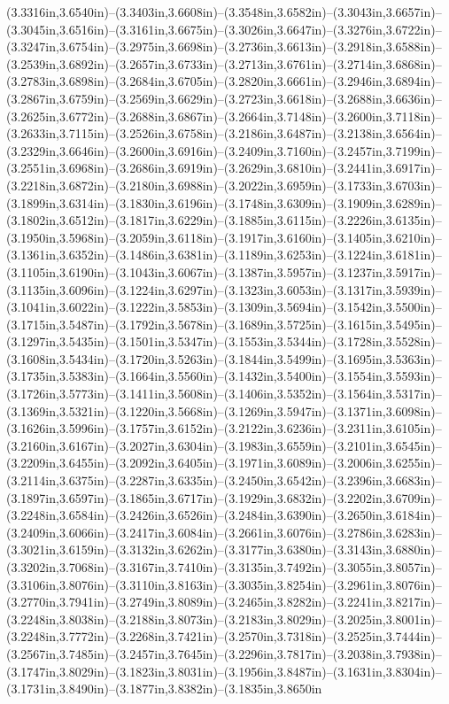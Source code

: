 (3.3316in,3.6540in)--(3.3403in,3.6608in)--(3.3548in,3.6582in)--(3.3043in,3.6657in)--(3.3045in,3.6516in)--(3.3161in,3.6675in)--(3.3026in,3.6647in)--(3.3276in,3.6722in)--(3.3247in,3.6754in)--(3.2975in,3.6698in)--(3.2736in,3.6613in)--(3.2918in,3.6588in)--(3.2539in,3.6892in)--(3.2657in,3.6733in)--(3.2713in,3.6761in)--(3.2714in,3.6868in)--(3.2783in,3.6898in)--(3.2684in,3.6705in)--(3.2820in,3.6661in)--(3.2946in,3.6894in)--(3.2867in,3.6759in)--(3.2569in,3.6629in)--(3.2723in,3.6618in)--(3.2688in,3.6636in)--(3.2625in,3.6772in)--(3.2688in,3.6867in)--(3.2664in,3.7148in)--(3.2600in,3.7118in)--(3.2633in,3.7115in)--(3.2526in,3.6758in)--(3.2186in,3.6487in)--(3.2138in,3.6564in)--(3.2329in,3.6646in)--(3.2600in,3.6916in)--(3.2409in,3.7160in)--(3.2457in,3.7199in)--(3.2551in,3.6968in)--(3.2686in,3.6919in)--(3.2629in,3.6810in)--(3.2441in,3.6917in)--(3.2218in,3.6872in)--(3.2180in,3.6988in)--(3.2022in,3.6959in)--(3.1733in,3.6703in)--(3.1899in,3.6314in)--(3.1830in,3.6196in)--(3.1748in,3.6309in)--(3.1909in,3.6289in)--(3.1802in,3.6512in)--(3.1817in,3.6229in)--(3.1885in,3.6115in)--(3.2226in,3.6135in)--(3.1950in,3.5968in)--(3.2059in,3.6118in)--(3.1917in,3.6160in)--(3.1405in,3.6210in)--(3.1361in,3.6352in)--(3.1486in,3.6381in)--(3.1189in,3.6253in)--(3.1224in,3.6181in)--(3.1105in,3.6190in)--(3.1043in,3.6067in)--(3.1387in,3.5957in)--(3.1237in,3.5917in)--(3.1135in,3.6096in)--(3.1224in,3.6297in)--(3.1323in,3.6053in)--(3.1317in,3.5939in)--(3.1041in,3.6022in)--(3.1222in,3.5853in)--(3.1309in,3.5694in)--(3.1542in,3.5500in)--(3.1715in,3.5487in)--(3.1792in,3.5678in)--(3.1689in,3.5725in)--(3.1615in,3.5495in)--(3.1297in,3.5435in)--(3.1501in,3.5347in)--(3.1553in,3.5344in)--(3.1728in,3.5528in)--(3.1608in,3.5434in)--(3.1720in,3.5263in)--(3.1844in,3.5499in)--(3.1695in,3.5363in)--(3.1735in,3.5383in)--(3.1664in,3.5560in)--(3.1432in,3.5400in)--(3.1554in,3.5593in)--(3.1726in,3.5773in)--(3.1411in,3.5608in)--(3.1406in,3.5352in)--(3.1564in,3.5317in)--(3.1369in,3.5321in)--(3.1220in,3.5668in)--(3.1269in,3.5947in)--(3.1371in,3.6098in)--(3.1626in,3.5996in)--(3.1757in,3.6152in)--(3.2122in,3.6236in)--(3.2311in,3.6105in)--(3.2160in,3.6167in)--(3.2027in,3.6304in)--(3.1983in,3.6559in)--(3.2101in,3.6545in)--(3.2209in,3.6455in)--(3.2092in,3.6405in)--(3.1971in,3.6089in)--(3.2006in,3.6255in)--(3.2114in,3.6375in)--(3.2287in,3.6335in)--(3.2450in,3.6542in)--(3.2396in,3.6683in)--(3.1897in,3.6597in)--(3.1865in,3.6717in)--(3.1929in,3.6832in)--(3.2202in,3.6709in)--(3.2248in,3.6584in)--(3.2426in,3.6526in)--(3.2484in,3.6390in)--(3.2650in,3.6184in)--(3.2409in,3.6066in)--(3.2417in,3.6084in)--(3.2661in,3.6076in)--(3.2786in,3.6283in)--(3.3021in,3.6159in)--(3.3132in,3.6262in)--(3.3177in,3.6380in)--(3.3143in,3.6880in)--(3.3202in,3.7068in)--(3.3167in,3.7410in)--(3.3135in,3.7492in)--(3.3055in,3.8057in)--(3.3106in,3.8076in)--(3.3110in,3.8163in)--(3.3035in,3.8254in)--(3.2961in,3.8076in)--(3.2770in,3.7941in)--(3.2749in,3.8089in)--(3.2465in,3.8282in)--(3.2241in,3.8217in)--(3.2248in,3.8038in)--(3.2188in,3.8073in)--(3.2183in,3.8029in)--(3.2025in,3.8001in)--(3.2248in,3.7772in)--(3.2268in,3.7421in)--(3.2570in,3.7318in)--(3.2525in,3.7444in)--(3.2567in,3.7485in)--(3.2457in,3.7645in)--(3.2296in,3.7817in)--(3.2038in,3.7938in)--(3.1747in,3.8029in)--(3.1823in,3.8031in)--(3.1956in,3.8487in)--(3.1631in,3.8304in)--(3.1731in,3.8490in)--(3.1877in,3.8382in)--(3.1835in,3.8650in
